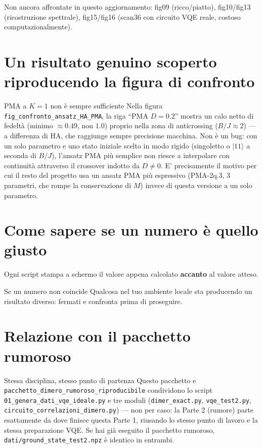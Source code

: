 \documentclass[11pt,a4paper]{article}
\newcommand{\ket}[1]{\lvert #1 \rangle}
\newcommand{\code}[1]{\texttt{\small #1}}
\begin{document}
Non ancora affrontate in questo aggiornamento: fig09 (ricco/piatto),
fig10/fig13 (ricostruzione spettrale), fig15/fig16 (scan36 con circuito
VQE reale, costoso computazionalmente).

\section{Un risultato genuino scoperto riproducendo la figura di confronto}
\label{sec:pma-k1}

\begin{warnbox}{PMA a $K=1$ non è sempre sufficiente}
Nella figura \code{fig\_confronto\_ansatz\_HA\_PMA}, la riga ``PMA
$D=0.2$'' mostra un calo netto di fedeltà (minimo $\approx0.49$, non
$1.0$) proprio nella zona di anticrossing ($B/J\approx2$) --- a
differenza di HA, che raggiunge sempre precisione macchina. Non è un
bug: con un solo parametro e uno stato iniziale scelto in modo rigido
(singoletto o $\ket{11}$ a seconda di $B/J$), l'ansatz PMA più semplice
non riesce a interpolare con continuità attraverso il crossover indotto
da $D\neq0$. E' precisamente il motivo per cui il resto del progetto usa
un ansatz PMA più espressivo (PMA-2q.3, 3 parametri, che rompe la
conservazione di $M$) invece di questa versione a un solo parametro.
\end{warnbox}

\section{Come sapere se un numero è quello giusto}

Ogni script stampa a schermo il valore appena calcolato \textbf{accanto}
al valore atteso.

\begin{warnbox}{Se un numero non coincide}
Qualcosa nel tuo ambiente locale sta producendo un risultato diverso:
fermati e confronta prima di proseguire.
\end{warnbox}

\section{Relazione con il pacchetto rumoroso}

\begin{okbox}{Stessa disciplina, stesso punto di partenza}
Questo pacchetto e \code{pacchetto\_dimero\_rumoroso\_riproducibile}
condividono lo script \code{01\_genera\_dati\_vqe\_ideale.py} e tre
moduli (\code{dimer\_exact.py}, \code{vqe\_test2.py},
\code{circuito\_correlazioni\_dimero.py}) --- non per caso: la Parte 2
(rumore) parte esattamente da dove finisce questa Parte 1, riusando lo
stesso punto di lavoro e la stessa preparazione VQE. Se hai già
eseguito il pacchetto rumoroso, \code{dati/ground\_state\_test2.npz} è
identico in entrambi.
\end{okbox}
\end{document}
